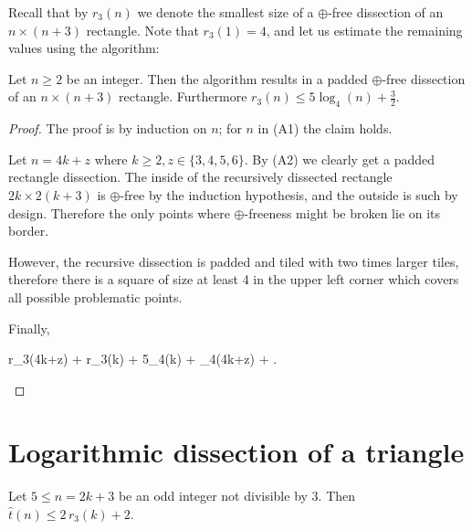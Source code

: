 Recall that by $r_3(n)$ we denote the smallest size of a $\oplus$-free dissection of an $n \times (n+3)$ rectangle. Note that $r_3(1) = 4$, and let us estimate the remaining values using the algorithm:

\begin{lem}
\label{lem:r3n}
Let $n \geq 2$ be an integer. Then the algorithm results in a padded $\oplus$-free dissection of an $n \times (n+3)$ rectangle. Furthermore $r_3(n) \leq 5\log_4(n)+\frac{3}{2}$.
\end{lem}
\begin{proof}
The proof is by induction on $n$; for $n$ in (A1) the claim holds.

Let $n = 4k+z$ where $k \geq 2, z \in \{3,4,5,6\}$. By (A2) we clearly get a padded rectangle dissection. The inside of the recursively dissected rectangle $2k \times 2(k+3)$ is $\oplus$-free by the induction hypothesis, and the outside is such by design. Therefore the only points where $\oplus$-freeness might be broken lie on its border.

However, the recursive dissection is padded and tiled with two times larger tiles, therefore there is a square of size at least 4 in the upper left corner which covers all possible problematic points.

Finally,
\begin{cosyeqnarray}
	r_3(4k+z)  + r_3(k)  + 5\log_4(k) +   \log_4(4k+z) + .
\end{cosyeqnarray}%
\end{proof}

\section{Logarithmic dissection of a triangle}
\label{sec:log-dissection-triangle}

\begin{lem}
\label{lem:triangles-to-squares}
Let $5 \leq n = 2k+3$ be an odd integer not divisible by 3. Then $\hat t(n) \leq 2\,r_3(k)+2$.
\end{lem}

